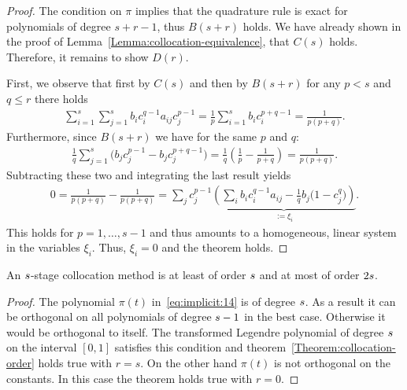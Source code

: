 \begin{proof}
  The condition on $\pi$ implies that the quadrature rule is exact for
  polynomials of degree $s+r-1$, thus $B(s+r)$ holds.
  We have already shown in the proof of
  Lemma~\ref{Lemma:collocation-equivalence}, that $C(s)$
  holds. Therefore, it remains to show $D(r)$.

  First, we observe that first by $C(s)$ and then by $B(s+r)$ for
  any $p<s$ and $q\le r$ there holds
  \begin{gather*}
    \sum_{i=1}^s\sum_{j=1}^s b_i c_i^{q-1} a_{ij} c_j^{p-1}
    = \frac1p \sum_{i=1}^s b_i c_i^{p+q-1}
    = \frac1{p(p+q)}.
  \end{gather*}
  Furthermore, since $B(s+r)$ we have for the same $p$ and $q$:
  \begin{gather*}
    \frac1q\sum_{j=1}^s\bigl(b_j c_j^{p-1} - b_j c_j^{p+q-1}\bigr)
    = \frac1q\left(\frac1p - \frac1{p+q}\right)
    = \frac1{p(p+q)}.
  \end{gather*}
  Subtracting these two and integrating the last result yields
  \begin{gather*}
    0 = \frac{1}{p(p+q)}-\frac{1}{p(p+q)} =
    \sum_{j} c_j^{p-1} \underbrace{\left(
      \sum_i b_i c_i^{q-1}a_{ij} - \frac1q b_j \bigl(1-c_j^q\bigr)
    \right)}_{:= \xi_i}.
  \end{gather*}
  This holds for $p=1,\dots,s-1$ and thus amounts to a homogeneous,
  linear system in the variables $\xi_i$. Thus, $\xi_i=0$ and the
  theorem holds. %
\end{proof}

\begin{corollary}
  An $s$-stage collocation method is at least of order
  $s$ and at most of order $2s$.
\end{corollary}

\begin{proof}
  The polynomial $\pi(t)$ in~\eqref{eq:implicit:14} is of degree
  $s$. As a result it can be orthogonal on all polynomials of
  degree $s-1$ in the best case.  Otherwise it would be orthogonal
  to itself.  The transformed Legendre polynomial of degree $s$ on
  the interval $[0,1]$ satisfies this condition and
  theorem~\ref{Theorem:collocation-order} holds true with
  $r=s$. On the other hand $\pi(t)$ is not orthogonal on the
  constants. In this case the theorem holds true with $r=0$.
\end{proof}




